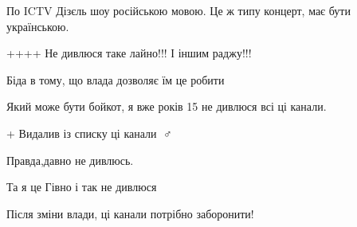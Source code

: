 \begin{itemize}
По ICTV Дізєль шоу російською мовою. Це ж типу концерт, має бути українською.


 
++++ Не дивлюся таке лайно!!! І іншим раджу!!!

 
Біда в тому, що влада дозволяє їм це робити

 
Який може бути бойкот, я вже років 15 не дивлюся всі ці канали.

 
+
Видалив із списку ці канали 💁♂️

 
Правда,давно не дивлюсь.

 
Та я це Гівно і так не дивлюся

 
Після зміни влади, ці канали потрібно заборонити!


\end{itemize}
